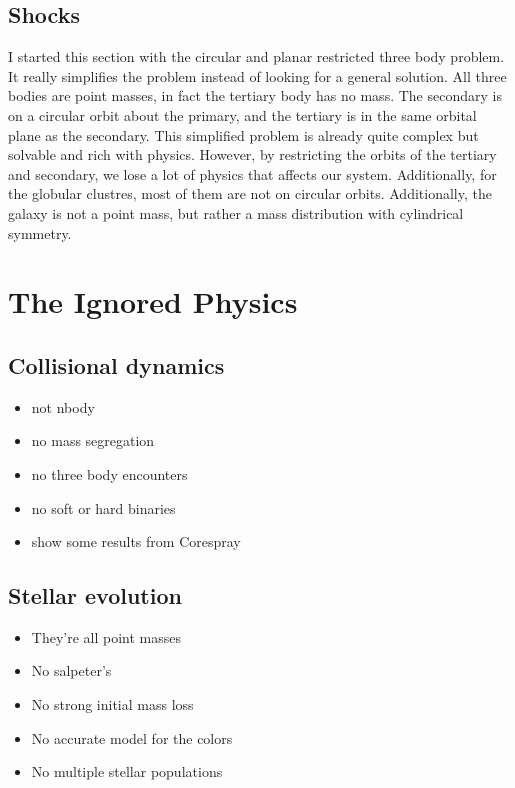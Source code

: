     \subsection{Shocks}
        I started this section with the circular and planar restricted three body problem. It really simplifies the problem instead of looking for a general solution. All three bodies are point masses, in fact the tertiary body has no mass. The secondary is on a circular orbit about the primary, and the tertiary is in the same orbital plane as the secondary. This simplified problem is already quite complex but solvable and rich with physics. However, by restricting the orbits of the tertiary and secondary, we lose a lot of physics that affects our system. Additionally, for the globular clustres, most of them are not on circular orbits. Additionally, the galaxy is not a point mass, but rather a mass distribution with cylindrical symmetry.        



\section{The Ignored Physics}
    \subsection{Collisional dynamics}
        \begin{itemize}
            \item not nbody
            \item no mass segregation
            \item no three body encounters 
            \item no soft or hard binaries 
            \item show some results from Corespray 
        \end{itemize}
    
    \subsection{Stellar evolution}
        \begin{itemize}
            \item They're all point masses 
            \item No salpeter's 
            \item No strong initial mass loss 
            \item No accurate model for the colors 
            \item No multiple stellar populations 
        \end{itemize}
    
